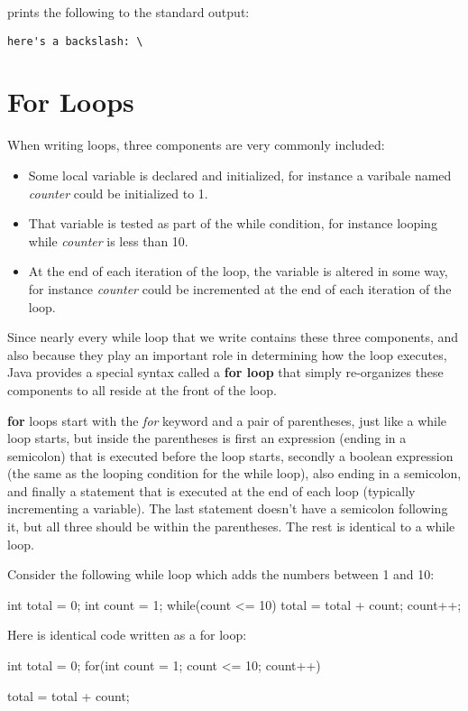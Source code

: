 prints the following to the standard output:

\begin{verbatim}
here's a backslash: \
\end{verbatim}


\section{For Loops}

When writing loops, three components are very commonly included: 
\begin{itemize}
\item Some local variable is declared and initialized, for instance a varibale named \textit{counter} could be initialized to 1. 
\item That variable is tested as part of the while condition, for instance looping while \textit{counter} is less than 10. 
\item At the end of each iteration of the loop, the variable is altered in some way, for instance \textit{counter} could be incremented at the end of each iteration of the loop. 
\end{itemize}

Since nearly every while loop that we write contains these three components, and also because they play an important role in determining how the loop executes, Java provides a special syntax called a \textbf{for loop} that simply re-organizes these components to all reside at the front of the loop. 

\textbf{for} loops start with the \textit{for} keyword and a pair of parentheses, just like a while loop starts, but inside the parentheses is first an expression (ending in a semicolon) that is executed before the loop starts, secondly a boolean expression (the same as the looping condition for the while loop), also ending in a semicolon, and finally a statement that is executed at the end of each loop (typically incrementing a variable). The last statement doesn't have a semicolon following it, but all three should be within the parentheses. The rest is identical to a while loop. 

\begin{exa}
Consider the following while loop which adds the numbers between 1 and 10:


\begin{code}
int total = 0;
int count = 1;
while(count <= 10) {
  total = total + count;
  count++;
}
\end{code}

Here is identical code written as a for loop:


\begin{code}

int total = 0;
for(int count = 1; count <= 10; count++) {

  total = total + count;
}
\end{code}
\end{exa}

